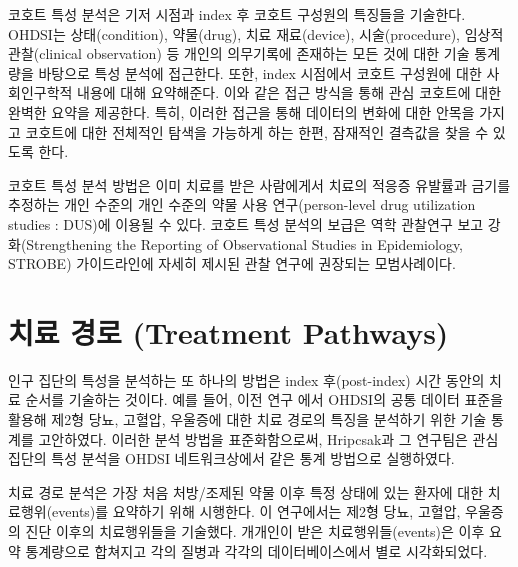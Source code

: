 \documentclass[11pt]{book}
\theoremstyle{definition}
\theoremstyle{definition}
\theoremstyle{definition}
\theoremstyle{remark}
\begin{document}
코호트 특성 분석은 기저 시점과 index 후 코호트 구성원의 특징들을
기술한다. OHDSI는 상태(condition), 약물(drug), 치료 재료(device),
시술(procedure), 임상적 관찰(clinical observation) 등 개인의 의무기록에
존재하는 모든 것에 대한 기술 통계량을 바탕으로 특성 분석에 접근한다.
또한, index 시점에서 코호트 구성원에 대한 사회인구학적 내용에 대해
요약해준다. 이와 같은 접근 방식을 통해 관심 코호트에 대한 완벽한 요약을
제공한다. 특히, 이러한 접근을 통해 데이터의 변화에 대한 안목을 가지고
코호트에 대한 전체적인 탐색을 가능하게 하는 한편, 잠재적인 결측값을 찾을
수 있도록 한다.

코호트 특성 분석 방법은 이미 치료를 받은 사람에게서 치료의 적응증
유발률과 금기를 추정하는 개인 수준의 개인 수준의 약물 사용
연구(person-level drug utilization studies : DUS)에 이용될 수 있다.
코호트 특성 분석의 보급은 역학 관찰연구 보고 강화(Strengthening the
Reporting of Observational Studies in Epidemiology, STROBE) 가이드라인에
자세히 제시된 관찰 연구에 권장되는 모범사례이다. \citep{VONELM2008344}

\section{치료 경로 (Treatment Pathways)}\label{--treatment-pathways}

인구 집단의 특성을 분석하는 또 하나의 방법은 index 후(post-index) 시간
동안의 치료 순서를 기술하는 것이다. 예를 들어, 이전 연구
\citep{Hripcsak7329} 에서 OHDSI의 공통 데이터 표준을 활용해 제2형 당뇨,
고혈압, 우울증에 대한 치료 경로의 특징을 분석하기 위한 기술 통계를
고안하였다. 이러한 분석 방법을 표준화함으로써, Hripcsak과 그 연구팀은
관심 집단의 특성 분석을 OHDSI 네트워크상에서 같은 통계 방법으로
실행하였다. 

치료 경로 분석은 가장 처음 처방/조제된 약물 이후 특정 상태에 있는 환자에
대한 치료행위(events)를 요약하기 위해 시행한다. 이 연구에서는 제2형
당뇨, 고혈압, 우울증의 진단 이후의 치료행위들을 기술했다. 개개인이 받은
치료행위들(events)은 이후 요약 통계량으로 합쳐지고 각의 질병과 각각의
데이터베이스에서 별로 시각화되었다.
\end{document}
